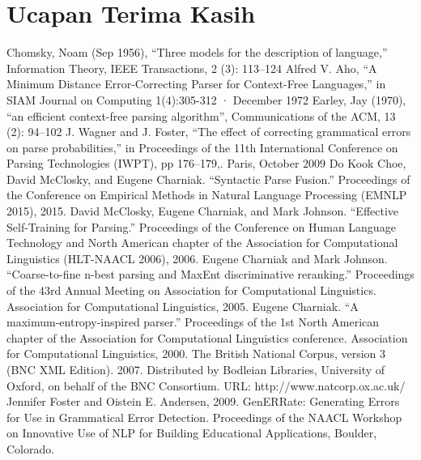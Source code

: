 \documentclass[conference]{IEEEtran}
\begin{document}
\section*{Ucapan Terima Kasih}

\begin{thebibliography}{00}
 Chomsky, Noam (Sep 1956), ``Three models for the description of language,'' Information Theory, IEEE Transactions, 2 (3): 113--124
 Alfred V. Aho, ``A Minimum Distance Error-Correcting Parser for Context-Free Languages,'' in SIAM Journal on Computing 1(4):305-312 · December 1972
Earley, Jay (1970), ``an efficient context-free parsing algorithm'', Communications of the ACM, 13 (2): 94--102
 J. Wagner and J. Foster, ``The effect of correcting grammatical errors on parse probabilities,'' in Proceedings of the 11th International Conference on Parsing Technologies (IWPT), pp 176--179,. Paris, October 2009
 Do Kook Choe, David McClosky, and Eugene Charniak. ``Syntactic Parse Fusion.'' Proceedings of the Conference on Empirical Methods in Natural Language Processing (EMNLP 2015), 2015.
 David McClosky, Eugene Charniak, and Mark Johnson. ``Effective Self-Training for Parsing.'' Proceedings of the Conference on Human Language Technology and North American chapter of the Association for Computational Linguistics (HLT-NAACL 2006), 2006.
 Eugene Charniak and Mark Johnson. ``Coarse-to-fine n-best parsing and MaxEnt discriminative reranking.'' Proceedings of the 43rd Annual Meeting on Association for Computational Linguistics. Association for Computational Linguistics, 2005.
 Eugene Charniak. ``A maximum-entropy-inspired parser.'' Proceedings of the 1st North American chapter of the Association for Computational Linguistics conference. Association for Computational Linguistics, 2000.
 The British National Corpus, version 3 (BNC XML Edition). 2007. Distributed by Bodleian Libraries, University of Oxford, on behalf of the BNC Consortium. URL: http://www.natcorp.ox.ac.uk/
 Jennifer Foster and Oistein E. Andersen, 2009. GenERRate: Generating Errors for Use in Grammatical Error Detection. Proceedings of the NAACL Workshop on Innovative Use of NLP for Building Educational Applications, Boulder, Colorado.
\end{thebibliography}
\end{document}
